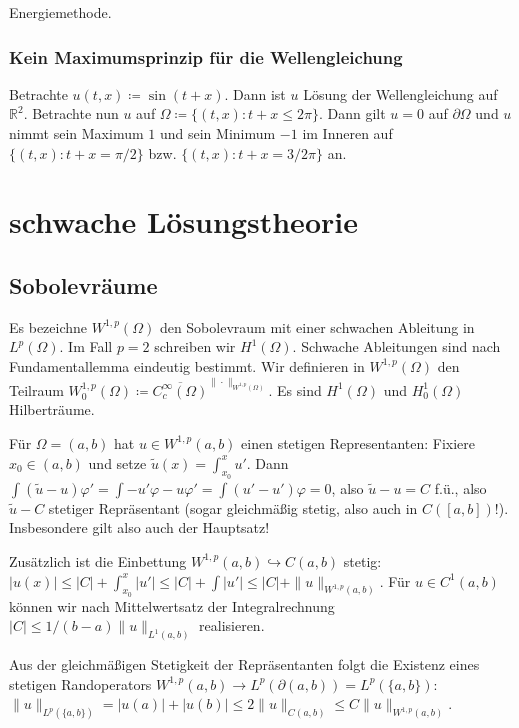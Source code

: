 \documentclass[11pt,a4paper]{scrartcl}
\newcommand{\R}{\mathbb{R}} %
\theoremstyle{plain}
\theoremstyle{definition}
\theoremstyle{remark}
\begin{document}
Energiemethode.

\subsubsection{Kein Maximumsprinzip für die Wellengleichung}

Betrachte $u(t,x)\coloneqq \sin(t+x)$. Dann ist $u$ Lösung der Wellengleichung auf $\R^2$. Betrachte nun $u$ auf $\Omega \coloneqq \{ (t,x): t+x \leq 2\pi \}$. Dann gilt $u=0$ auf $\partial\Omega$ und $u$ nimmt sein Maximum $1$ und sein Minimum $-1$ im Inneren auf $\{ (t,x): t+x=\pi/2 \}$ bzw. $\{ (t,x): t+x=3/2\pi \}$ an.

\section{schwache Lösungstheorie}

\subsection{Sobolevräume}

Es bezeichne $W^{1,p}(\Omega)$ den Sobolevraum mit einer schwachen Ableitung in $L^p(\Omega)$. Im Fall $p=2$ schreiben wir $H^1(\Omega)$. Schwache Ableitungen sind nach Fundamentallemma eindeutig bestimmt. Wir definieren in $W^{1,p}(\Omega)$ den Teilraum $W^{1,p}_0(\Omega) \coloneqq \overline{C_c^\infty(\Omega)}^{\|\cdot\|_{W^{1,p}(\Omega)}}$. Es sind $H^1(\Omega)$ und $H^1_0(\Omega)$ Hilberträume.

Für $\Omega=(a,b)$ hat $u\in W^{1,p}(a,b)$ einen stetigen Representanten: Fixiere $x_0\in (a,b)$ und setze $\tilde u(x)=\int_{x_0}^x u'$. Dann $\int (\tilde u-u)\varphi'=\int -u'\varphi-u\varphi'=\int (u'-u')\varphi=0$, also $\tilde u-u=C$ f.ü., also $\tilde u-C$ stetiger Repräsentant (sogar gleichmäßig stetig, also auch in $C([a,b])$!). Insbesondere gilt also auch der Hauptsatz!

Zusätzlich ist die Einbettung $W^{1,p}(a,b) \hookrightarrow C(a,b)$ stetig: $|u(x)| \leq |C| + \int_{x_0}^x |u'| \leq |C| + \int |u'| \leq |C| +\|u\|_{W^{1,p}(a,b)}$. Für $u\in C^1(a,b)$ können wir nach Mittelwertsatz der Integralrechnung $|C| \leq 1/(b-a) \|u\|_{L^1(a,b)}$ realisieren.

Aus der gleichmäßigen Stetigkeit der Repräsentanten folgt die Existenz eines stetigen Randoperators $W^{1,p}(a,b)\to L^p(\partial (a,b))=L^p(\{a,b\})$: $\|u\|_{L^p(\{a,b\})} = |u(a)|+|u(b)| \leq 2 \|u\|_{C(a,b)} \leq C \|u\|_{W^{1,p}(a,b)}$.
\end{document}

